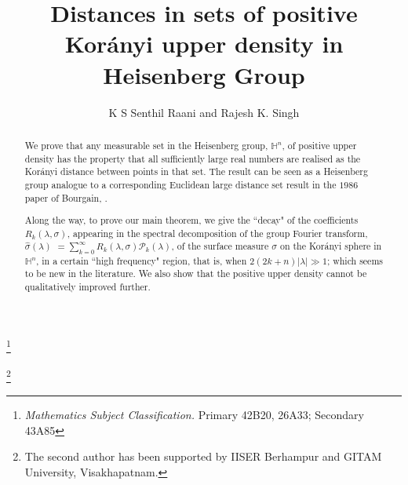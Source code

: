 \documentclass[11pt, reqno]{amsart}
\theoremstyle{plain}
\theoremstyle{remark}
\theoremstyle{example}
\theoremstyle{definition}
\numberwithin{equation}{section}
\def\Ha{\mathbb{H}^n}
\begin{document}
\title[Distances in sets of positive Kor\'anyi upper density in Heisenberg Group]{Distances in sets of positive Kor\'anyi upper density in Heisenberg Group}

{\let\thefootnote\relax\footnote{ {\it Mathematics Subject Classification.} Primary 42B20, 26A33; Secondary 43A85}}


\thanks{The second author has been supported by IISER Berhampur and GITAM University, Visakhapatnam.}


\author{K S Senthil Raani and Rajesh K. Singh}


\address[K S Senthil Raani]{IISER Berhampur, Laudigam, District Ganjam, Odisha, India-760003.}


\address[Rajesh K. Singh]{Department of Mathematics and Statistics, Gitam Institute of Science, GITAM University, Visakhapatnam - 530045, A.P., India}



\pagestyle{headings}

\begin{abstract}

We prove that any measurable set in the Heisenberg group, $\Ha$, of positive upper density has the property that all sufficiently large real numbers are realised as the Kor\'anyi distance between points in that set. The result can be seen as a Heisenberg group analogue to a corresponding Euclidean large distance set result in the $1986$ paper of Bourgain, \cite{1986Bourgain}.%
 
Along the way, to prove our main theorem, we give the ``decay" of the coefficients $R_{k}(\lambda, \sigma)$, appearing in the spectral decomposition of the group Fourier transform, $\hat{\sigma}(\lambda)$ $= \sum_{k=0}^{\infty} R_{k}(\lambda, \sigma) \mathcal{P}_{k}(\lambda)$, of  the surface measure $\sigma$ on the Kor\'anyi sphere in $\Ha$, in a certain ``high frequency" region, that is, when $2(2k+n) |\lambda| \gg 1$; which seems to be new in the literature. We also show  that the positive upper density cannot be qualitatively improved further.
\end{abstract}
\end{document}

